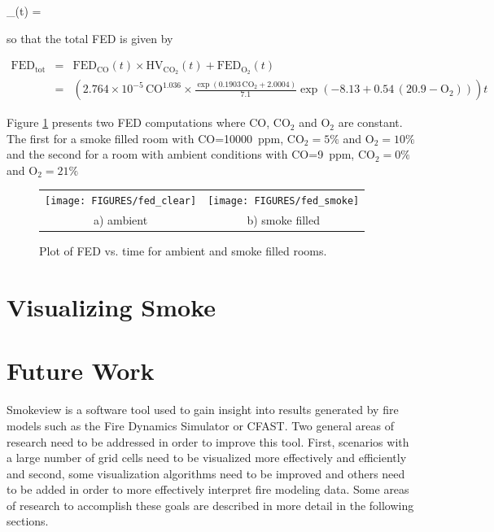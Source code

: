 \documentclass[11pt,twoside]{book}
\begin{document}
\be
{}_(t) = 
\label{eq:fedCO2cons}
\ee

so that the total FED is given by

\begin{eqnarray}
\mathrm{FED}_\mathrm{tot} &= &\mathrm{FED}_\mathrm{CO}(t)\times\mathrm{HV}_\mathrm{CO_2}(t)+\mathrm{FED}_\mathrm{O_2}(t)\\
 &= &\left(2.764 \times 10^{-5} \, \mathrm{CO}^{1.036}\times\frac{ \exp( 0.1903 \, \mathrm{CO_2} +  2.0004 ) }{7.1}\exp( -8.13 + 0.54 \, (20.9 - \mathrm{O_2}) )\right) t
\end{eqnarray}

Figure \ref{fig:fedplot} presents two FED computations where CO, $\mathrm{CO_2}$ and $\mathrm{O_2}$ are constant.  The first for a smoke filled room with CO=\SI{10000}{ppm}, $\mathrm{CO_2}=5 \%$ and $\mathrm{O_2}=10 \%$ and the second for a room with ambient conditions with CO=\SI{9}{ppm}, $\mathrm{CO_2}=0 \%$ and $\mathrm{O_2}=21 \%$

\begin{figure}[\figoptions]
\begin{center}
\begin{tabular}{cc}
\texttt{[image: FIGURES/fed\_clear]}&
\texttt{[image: FIGURES/fed\_smoke]}\\
a) ambient&b) smoke filled\\
\end{tabular}
\end{center}
\caption{Plot of FED vs. time for ambient and smoke filled rooms.}
\label{fig:fedplot}%
\end{figure}

%
%

\chapter{Visualizing Smoke}

\newcommand{\citesmv}{\cite{Smokeview_Users_Guide}}
\newcommand{\paper}{chapter}

%
%

\chapter{Future Work}

Smokeview is a software tool used to gain insight into results
generated by fire models such as the Fire Dynamics Simulator or
CFAST. Two general areas of research need to be addressed in order
to improve this tool. First, scenarios with a large number of grid
cells need to be visualized more effectively and efficiently and
second, some visualization algorithms need to be improved and
others need to be added in order to more effectively interpret
fire modeling data. Some areas of research to accomplish these
goals are described in more detail in the following sections.
\end{document}
